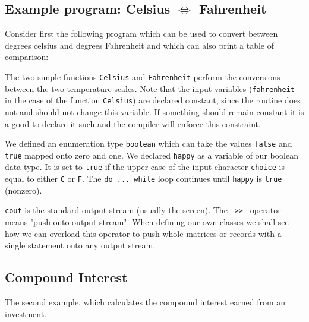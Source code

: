 
\subsection{Example program: Celsius $\Leftrightarrow$ Fahrenheit}

Consider first the following program which can be used to convert between
degrees celsius and degrees Fahrenheit and which can also print a table
of comparison: 
\noindent
{\small }

The two simple functions \verb+Celsius+ and \verb+Fahrenheit+ perform the
conversions between the two temperature scales. Note that the input variables
(\verb+fahrenheit+ in the case of the function \verb+Celsius+) are declared
constant, since the routine does not
and should not change
this variable. If something should remain constant it is a good to declare it
such and the compiler will enforce this constraint.

We defined an enumeration
type \verb+boolean+ which can take the values \verb+false+ and \verb+true+
mapped onto zero and one. We declared \verb+happy+ as a variable of our
boolean data type. It is set to \verb+true+ if the upper case of the input character
\verb+choice+ is equal to either \verb+C+ or \verb+F+. The \verb+do ... while+
 loop continues until \verb+happy+ is
\verb+true+ (nonzero).

\verb+cout+ is the standard output stream (usually the screen). The \verb+ >> +
 
operator means "push onto output stream". When defining our own classes we
shall see how we can overload this operator  to push
whole matrices or records with a single statement onto any output stream.


\subsection{Compound Interest}

The second example, which calculates the compound interest earned from an investment.
\noindent
{\small }


